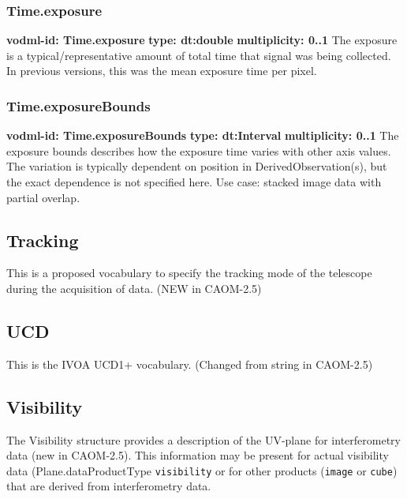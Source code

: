     \subsubsection{Time.exposure}
      \textbf{vodml-id: Time.exposure} \newline
      \textbf{type: dt:double} \newline
      \textbf{multiplicity: 0..1} \newline
      The exposure is a typical/representative amount of total time that signal was being collected. In previous versions, this was the mean exposure time per pixel.

    \subsubsection{Time.exposureBounds}
      \textbf{vodml-id: Time.exposureBounds} \newline
      \textbf{type: dt:Interval} \newline
      \textbf{multiplicity: 0..1} \newline
      The exposure bounds describes how the exposure time varies with other axis values. The variation is typically dependent on position in DerivedObservation(s), but the exact dependence is not specified here. Use case: stacked image data with partial overlap.

  \subsection{Tracking}
  \label{sect:Tracking}
    This is a proposed vocabulary to specify the tracking mode of the telescope during the acquisition of data. (NEW in CAOM-2.5)

  \subsection{UCD}
  \label{sect:UCD}
    This is the IVOA UCD1+ vocabulary. (Changed from string in CAOM-2.5)

  \subsection{Visibility}
  \label{sect:Visibility}
    The Visibility structure provides a description of the UV-plane for interferometry data (new in CAOM-2.5). This information may be present for actual visibility data (Plane.dataProductType \verb|visibility| or for other products (\verb|image| or \verb|cube|) that are derived from interferometry data.

